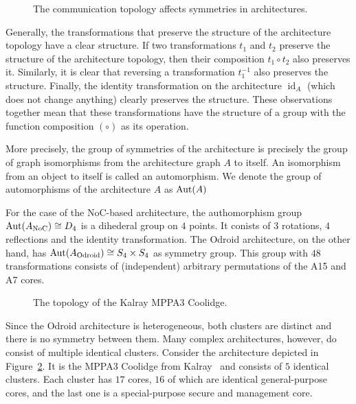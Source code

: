 \begin{figure}[h]
	\centering
\resizebox{0.7\textwidth}{!}{
   \begin{tikzpicture}
     
   \end{tikzpicture}
 }
   \caption{The communication topology affects symmetries in architectures.}
   \label{fig:non_equivalent}
\end{figure}

Generally, the transformations that preserve the structure of the architecture topology have a clear structure.
If two transformations $t_1$ and $t_2$ preserve the structure of the architecture topology, then their composition $t_1 \circ t_2$ also preserves it.
Similarly, it is clear that reversing a transformation $t_1^{-1}$ also preserves the structure.
Finally, the identity transformation on the architecture $\operatorname{id}_A$ (which does not change anything) clearly preserves the structure.
These observations together mean that these transformations have the structure of a group with the function composition $(\circ)$ as its operation.

More precisely, the group of symmetries of the architecture is precisely the group of graph isomorphisms from the architecture graph $A$ to itself.
An isomorphism from an object to itself is called an automorphism.
We denote the group of automorphisms of the architecture $A$ as $\operatorname{Aut}(A)$

For the case of the \ac{NoC}-based architecture, the authomorphism group $\operatorname{Aut}(A_\text{NoC}) \cong D_4$ is a dihederal group on $4$ points.
It conists of $3$ rotations, $4$ reflections and the identity transformation.
The Odroid architecture, on the other hand, has $\operatorname{Aut}(A_\text{Odroid}) \cong S_4 \times S_4$ as symmetry group.
This group with $48$ transformations consists of (independent) arbitrary permutations of the A15 and A7 cores.

\begin{figure}[h]
	\centering
\resizebox{0.9\textwidth}{!}{
   \begin{tikzpicture}
     
   \end{tikzpicture}
 }
   \caption{The topology of the Kalray MPPA3 Coolidge.}
   \label{fig:coolidge}
\end{figure}

Since the Odroid architecture is heterogeneous, both clusters are distinct and there is no symmetry between them.
Many complex architectures, however, do consist of multiple identical clusters.
Consider the architecture depicted in Figure~\ref{fig:coolidge}.
It is the MPPA3 Coolidge from Kalray~\cite{coolidge} and consists of $5$ identical clusters.
Each cluster has $17$ cores, $16$ of which are identical general-purpose cores, and the last one is a special-purpose secure and management core.

